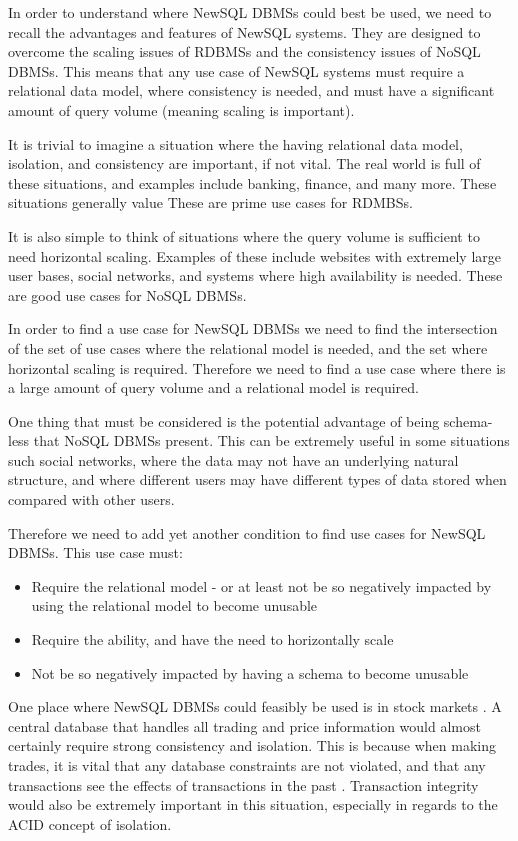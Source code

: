 \documentclass[10pt, conference]{IEEEtran}
\begin{document}
In order to understand where NewSQL DBMSs could best be used, we need to recall the advantages and features of NewSQL systems. They are designed to overcome the scaling issues of RDBMSs and the consistency issues of NoSQL DBMSs. This means that any use case of NewSQL systems must require a relational data model, where consistency is needed, and must have a significant amount of query volume (meaning scaling is important).

It is trivial to imagine a situation where the having relational data model, isolation, and consistency are important, if not vital. The real world is full of these situations, and examples include banking, finance, and many more. These situations generally value  These are prime use cases for RDMBSs.

It is also simple to think of situations where the query volume is sufficient to need horizontal scaling. Examples of these include websites with extremely large user bases, social networks, and systems where high availability is needed. These are good use cases for NoSQL DBMSs.

In order to find a use case for NewSQL DBMSs we need to find the intersection of the set of use cases where the relational model is needed, and the set where horizontal scaling is required. Therefore we need to find a use case where there is a large amount of query volume and a relational model is required.

One thing that must be considered is the potential advantage of being schema-less that NoSQL DBMSs present. This can be extremely useful in some situations such social networks, where the data may not have an underlying natural structure, and where different users may have different types of data stored when compared with other users. 

Therefore we need to add yet another condition to find use cases for NewSQL DBMSs. This use case must:
\begin{itemize}
	\item{Require the relational model - or at least not be so negatively impacted by using the relational model to become unusable}
	\item{Require the ability, and have the need to horizontally scale}
	\item{Not be so negatively impacted by having a schema to become unusable}
\end{itemize}

One place where NewSQL DBMSs could feasibly be used is in stock markets \cite{stock}. A central database that handles all trading and price information would almost certainly require strong consistency and isolation. This is because when making trades, it is vital that any database constraints are not violated, and that any transactions see the effects of transactions in the past \cite{adv}. Transaction integrity would also be extremely important in this situation, especially in regards to the ACID concept of isolation. 
\end{document}
